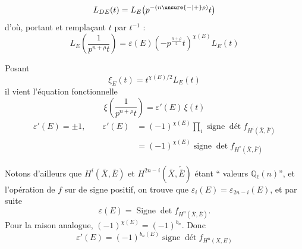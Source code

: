 \[
L_{DE}(t)=L_E\bigl(p^{-(n\unsure{-|+}\rho)}t\bigr)
\]
d'où, portant  et remplaçant $t$ par $t^{-1}$ :
\[
\boxed{L_E\left(\frac{1}{p^{n+\rho}t}\right)=\varepsilon(E)\left(-p^{\frac{n+\rho}{2}}t\right)^{\chi(E)}L_E(t)}\tag*{(3)}
\]

Posant
\[
\boxed{\xi_E(t)=t^{\chi(E)/2}L_E(t)}
\]
il vient l'équation fonctionnelle
\[
\boxed{\xi\left(\frac{1}{p^{n+\rho}t}\right)=\varepsilon'(E)\,\xi(t)}
\]
\[
\begin{aligned}
\varepsilon'(E)=\pm1,\qquad \varepsilon'(E)&=(-1)^{\chi(E)}\prod_i\operatorname{signe}\operatorname{dét} f_{H^i(\bar X,\bar F)}\\
&=(-1)^{\chi(E)}\operatorname{signe}\operatorname{det} f_{H^*(\bar X,\bar F)}
\end{aligned}
\]

 Notons d'ailleurs que $H^i(\bar X,\bar E)$ et $H^{2n-i}(\bar X,\check{\bar E})$  étant ``  valeurs  $\mathbb{Q}_{\ell}(n)$'', et l'opération de $f$ sur   de signe positif, on trouve que $\varepsilon_i(E)=\varepsilon_{2n-i}(E)$, et par suite
\[
\boxed{\varepsilon(E)=\operatorname{Signe}\operatorname{det} f_{H^n(\bar X,\bar E)}}.
\]
Pour la raison analogue, $(-1)^{\chi(E)}=(-1)^{b_n}$. Donc
\[
\varepsilon'(E)=(-1)^{b_n(E)}\operatorname{signe}\operatorname{dét}f_{H^n(X,E)}
\]
